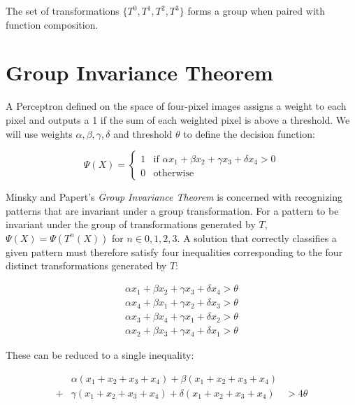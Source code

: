\documentclass[11pt]{article}
\theoremstyle{definition}
\theoremstyle{theorem}
\begin{document}
The set of transformations $\{T^0, T^1, T^2, T^3\}$ forms a group when paired with function composition.

\section*{Group Invariance Theorem}

A Perceptron defined on the space of four-pixel images assigns a weight to each pixel and outputs a 1 if the sum of each weighted pixel is above a threshold. We will use weights $\alpha, \beta, \gamma, \delta$ and threshold $\theta$ to define the decision function:

\begin{equation}
\Psi(X) = \begin{cases}
 	1 & \text{if $\alpha x_1 + \beta x_2 + \gamma x_3 + \delta x_4 > 0$} \\
 	0 & \text{otherwise}
 \end{cases}
\end{equation}

Minsky and Papert's \textit{Group Invariance Theorem} is concerned with recognizing patterns that are invariant under a group transformation. For a pattern to be invariant under the group of transformations generated by $T$, $\Psi(X)=\Psi(T^{n}(X))$ for $n \in {0,1,2,3}$. A solution that correctly classifies a given pattern must therefore satisfy four inequalities corresponding to the four distinct transformations generated by $T$:

\begin{equation}
\begin{aligned}
	\alpha x_1 + \beta x_2 + \gamma x_3 + \delta x_4 > \theta \\
	\alpha x_4 + \beta x_1 + \gamma x_2 + \delta x_3 > \theta \\
	\alpha x_3 + \beta x_4 + \gamma x_1 + \delta x_2 > \theta \\
	\alpha x_2 + \beta x_3 + \gamma x_4 + \delta x_1 > \theta
\end{aligned}
\end{equation}

These can be reduced to a single inequality:

\begin{equation*}
\begin{aligned}
	  &\alpha(x_1 + x_2 + x_3 + x_4) + \beta(x_1 + x_2 + x_3 + x_4)& \\
	+ &\gamma(x_1 + x_2 + x_3 + x_4) + \delta(x_1 + x_2 + x_3 + x_4) &> 4\theta
\end{aligned}
\end{equation*}
\end{document}

